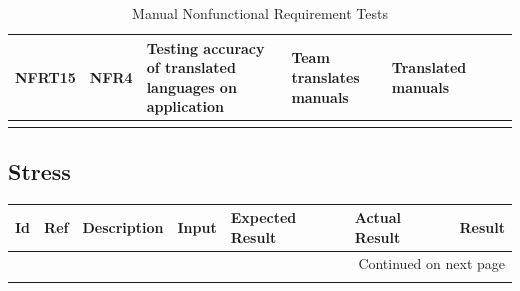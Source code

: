 \documentclass[12pt, titlepage]{article}
\begin{document}
\begin{longtable}{|p{1.4cm}|p{1.0cm}|p{2.5cm}|p{1.5cm}|p{2.2cm}|p{2cm}|p{1.2cm}|}
  NFRT15        & NFR4         & Testing accuracy of translated languages on application                  & Team translates manuals          & Translated manuals                                          &                        &            \cellcolor[HTML]{FFFFFF}{\color[HTML]{F8A102} TBD}                                        \\ \hline
  \caption{Manual Nonfunctional Requirement Tests}
  \label{manualNonfunctionalRequirementTests}
\end{longtable}

\subsection{Stress}
		
\begin{longtable}{|p{1.4cm}|p{1.1cm}|p{2.5cm}|p{1.5cm}|p{2.2cm}|p{1.9cm}|p{1.2cm}|}

  \endfirsthead
  \hline
  \textbf{Id} & \textbf{Ref} & \textbf{Description}                                                         & \textbf{Input}                                    & \textbf{Expected Result}                                    & \textbf{Actual Result} & \textbf{Result}                                    \\ \hline

  \endhead

  \hline \multicolumn{7}{|r|}{Continued on next page} \\ \hline
  \endfoot
   

\end{longtable}
\end{document}
